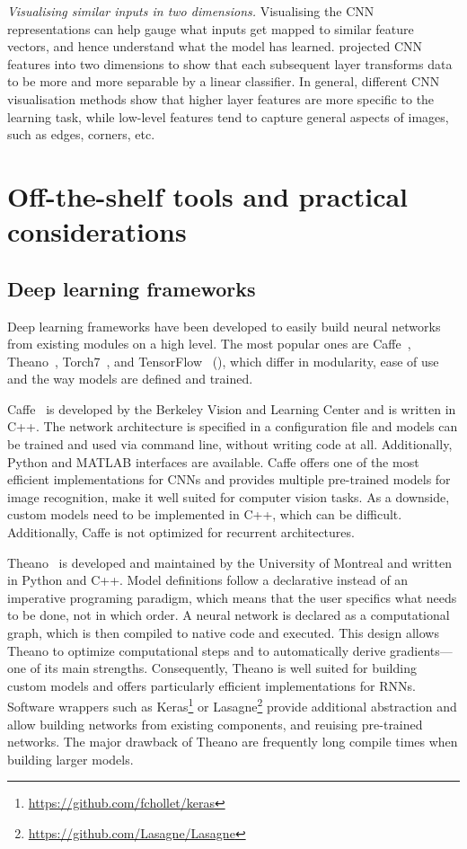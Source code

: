 \textit{Visualising similar inputs in two dimensions.} Visualising the CNN representations can help gauge what inputs get mapped to similar feature vectors, and hence understand what the model has learned. \citet{donahue_decaf:_2013} projected CNN features into two dimensions to show that each subsequent layer transforms data to be more and more separable by a linear classifier. In general, different CNN visualisation methods show that higher layer features are more specific to the learning task, while low-level features tend to capture general aspects of images, such as edges, corners, etc.


\section{Off-the-shelf tools and practical considerations}

\subsection{Deep learning frameworks}

Deep learning frameworks have been developed to easily build neural networks from existing modules on a high level. The most popular ones are Caffe~\citep{jia_caffe:_2014}, Theano~\citep{bastien_theano:_2012}, Torch7~\citep{collobert_torch7:_2011}, and TensorFlow~\citep{abadi_tensorflow:_2016} (), which differ in modularity, ease of use and the way models are defined and trained.

Caffe~\citep{jia_caffe:_2014} is developed by the Berkeley Vision and Learning Center and is written in C++. The network architecture is specified in a configuration file and models can be trained and used via command line, without writing code at all. Additionally, Python and MATLAB interfaces are available. Caffe offers one of the most efficient implementations for CNNs and provides multiple pre-trained models for image recognition, make it well suited for computer vision tasks. As a downside, custom models need to be implemented in C++, which can be difficult. Additionally, Caffe is not optimized for recurrent architectures.

Theano~\citep{bastien_theano:_2012} is developed and maintained by the University of Montreal and written in Python and C++. Model definitions follow a declarative instead of an imperative programing paradigm, which means that the user specifics what needs to be done, not in which order. A neural network is declared as a computational graph, which is then compiled to native code and executed. This design allows Theano to optimize computational steps and to automatically derive gradients—one of its main strengths. Consequently, Theano is well suited for building custom models and offers particularly efficient implementations for RNNs. Software wrappers such as Keras\footnote{\url{https://github.com/fchollet/keras}} or Lasagne\footnote{\url{https://github.com/Lasagne/Lasagne}} provide additional abstraction and allow building networks from existing components, and reuising pre-trained networks. The major drawback of Theano are frequently long compile times when building larger models.

